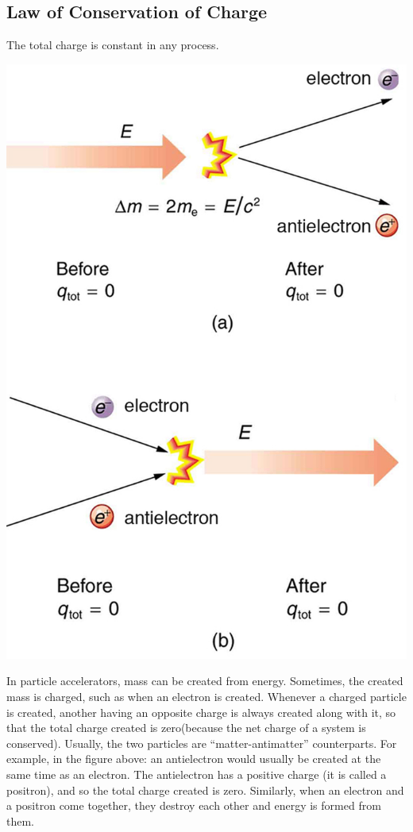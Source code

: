 \documentclass[9pt]{article}
\begin{document}
	\subsection*{Law of Conservation of Charge}
	The total charge is constant in any process. \begin{center}
		\includegraphics[scale=0.3]{charge_conservation.jpg}
	\end{center}
	In particle accelerators, mass can be created from energy. Sometimes, the created mass is charged, such as when an electron is created. Whenever a charged particle is created, another having an opposite charge is always created along with it, so that the total charge created is zero(because the net charge of a system is conserved). Usually, the two particles are “matter-antimatter” counterparts. For example, in the figure above: an antielectron would usually be created at the same time as an electron. The antielectron has a positive charge (it is called a positron), and so the total charge created is zero. Similarly, when an electron and a positron come together, they destroy each other and energy is formed from them.
\end{document}
